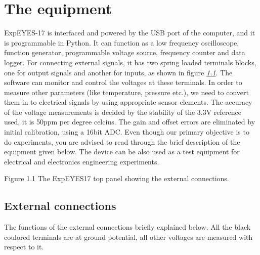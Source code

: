 \documentclass[a4paper,12pt,english]{sphinxmanual}
\let\sphinxpxdimen\pdfpxdimen\else\newdimen\sphinxpxdimen
\begin{document}
\chapter{The equipment}
\label{\detokenize{1.2:the-equipment}}\label{\detokenize{1.2::doc}}
ExpEYES-17 is interfaced and powered by the USB port of the computer,
and it is programmable in Python. It can function as a low frequency
oscilloscope, function generator, programmable voltage source, frequency
counter and data logger. For connecting external signals, it has two
spring loaded terminals blocks, one for output signals and another for
inputs, as shown in figure {\hyperref[\detokenize{1.2:fig:The-ExpEYES-toppanel}]{\emph{1.1}}}. The
software can monitor and control the voltages at these terminals. In
order to measure other parameters (like temperature, pressure etc.), we
need to convert them in to electrical signals by using appropriate
sensor elements. The accuracy of the voltage measurements is decided by
the stability of the 3.3V reference used, it is 50ppm per degree
celcius. The gain and offset errors are eliminated by initial
calibration, using a 16bit ADC. Even though our primary objective is to
do experiments, you are advised to read through the brief description of
the equipment given below. The device can be also used as a test
equipment for electrical and electronics engineering experiments.



\begin{figure}[htbp]
\centering

\noindent\sphinxincludegraphics[width=500\sphinxpxdimen]{{eyes17-panel}.pdf}
\end{figure}

Figure 1.1 The ExpEYES17 top panel showing the external connections.


\section{External connections}
\label{\detokenize{1.2:external-connections}}
The functions of the external connections briefly explained below. All
the black coulored terminals are at ground potential, all other voltages
are measured with respect to it.
\end{document}
